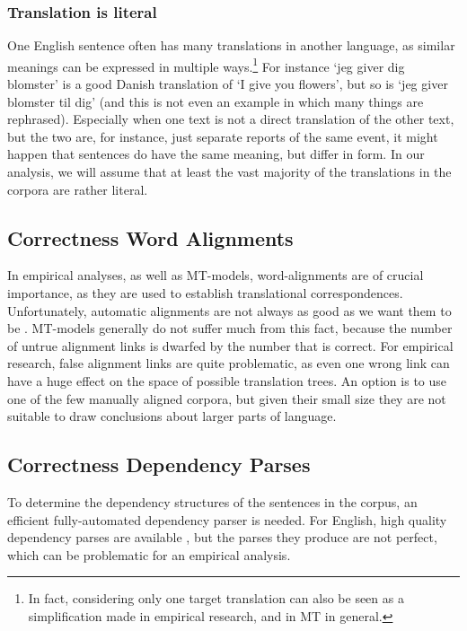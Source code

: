 \subsubsection{Translation is literal}
One English sentence often has many translations in another language, as similar meanings can be expressed in multiple ways.\footnote{In fact, considering only one target translation can also be seen as a simplification made in empirical research, and in MT in general.} For instance `jeg giver dig blomster' is a good Danish translation of `I give you flowers', but so is `jeg giver blomster til dig' (and this is not even an example in which many things are rephrased). Especially when one text is not a direct translation of the other text, but the two are, for instance, just separate reports of the same event, it might happen that sentences do have the same meaning, but differ in form. In our analysis, we will assume that at least the vast majority of the translations in the corpora are rather literal.
 
\subsection{Correctness Word Alignments}

In empirical analyses, as well as MT-models, word-alignments are of crucial importance, as they are used to establish translational correspondences. Unfortunately, automatic alignments are not always as good as we want them to be \citep[see][for concrete numbers]{och2000improved}. MT-models generally do not suffer much from this fact, because the number of untrue alignment links is dwarfed by the number that is correct. For empirical research, false alignment links are quite problematic, as even one wrong link can have a huge effect on the space of possible translation trees. An option is to use one of the few manually aligned corpora, but given their small size they are not suitable to draw conclusions about larger parts of language.

\subsection{Correctness Dependency Parses}

To determine the dependency structures of the sentences in the corpus, an efficient fully-automated dependency parser is needed.  For English, high quality dependency parses are available \citep{cer2010parsing}, but the parses they produce are not perfect, which can be problematic for an empirical analysis.



